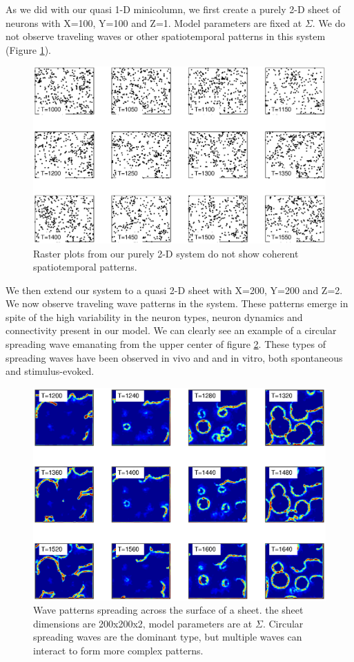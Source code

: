 As we did with our quasi 1-D minicolumn, we first create a purely 2-D sheet of neurons with X=100, Y=100 and Z=1.
Model parameters are fixed at $\Sigma$.
We do not observe traveling waves or other spatiotemporal patterns in this system (Figure \ref{fig:Pure2DRasters_NoWaves}).
\begin{figure}[!htb]
 \caption{ Raster plots from our purely 2-D system do not show coherent spatiotemporal patterns.}
 \label{fig:Pure2DRasters_NoWaves}
 \centering
   \includegraphics[width=\textwidth]{fig/2DWaveRasters_1LayerNoWaves}
\end{figure}
\FloatBarrier

We then extend our system to a quasi 2-D sheet with X=200, Y=200 and Z=2.
We now observe traveling wave patterns in the system.
These patterns emerge in spite of the high variability in the neuron types, neuron dynamics and connectivity present in our model.
We can clearly see an example of a circular spreading wave emanating from the upper center of figure \ref{fig:2D_waves}.
These types of spreading waves have been observed in vivo\citep{Mohajerani2013} and and in vitro, both spontaneous and stimulus-evoked\citep{Stroh2013}.
\begin{figure}[!htb]
 \caption{ Wave patterns spreading across the surface of a sheet. 
           the sheet dimensions are 200x200x2, model parameters are at $\Sigma$. 
           Circular spreading waves are the dominant type, but multiple waves can interact to form more complex patterns.}
 \label{fig:2D_waves}
 \centering
   \includegraphics[width=\textwidth]{fig/2DSpreadingWaves_Sigma}
\end{figure}

